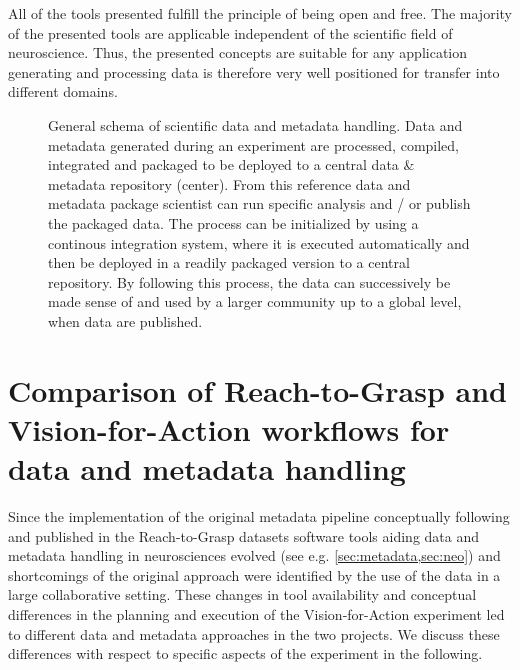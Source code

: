  All of the tools presented fulfill the principle of being open and free. The majority of the presented tools are applicable independent of the scientific field of neuroscience. Thus, the presented concepts are suitable for any application generating and processing data is therefore very well positioned for transfer into different domains.


\begin{figure}
 
 \caption[General schema of scientific data and metadata handling]{General schema of scientific data and metadata handling. Data and metadata generated during an experiment are processed, compiled, integrated and packaged to be deployed to a central data \& metadata repository (center). From this reference data and metadata package scientist can run specific analysis and / or publish the packaged data. The process can be initialized by using a continous integration system, where it is executed automatically and then be deployed in a readily packaged version to a central repository. By following this process, the data can successively be made sense of and used by a larger community up to a global level, when data are published.}
 \label{fig:disc_general_schema}
\end{figure}



\section{Comparison of Reach-to-Grasp and Vision-for-Action workflows for data and metadata handling}
Since the implementation of the original metadata pipeline conceptually following \citet{Zehl_2016} and published in the Reach-to-Grasp datasets \citep{Brochier_2018} software tools aiding data and metadata handling in neurosciences evolved (see e.g. \cref{sec:metadata,sec:neo}) and shortcomings of the original approach were identified by the use of the data in a large collaborative setting. These changes in tool availability and conceptual differences in the planning and execution of the Vision-for-Action experiment led to different data and metadata approaches in the two projects. We discuss these differences with respect to specific aspects of the experiment in the following.

